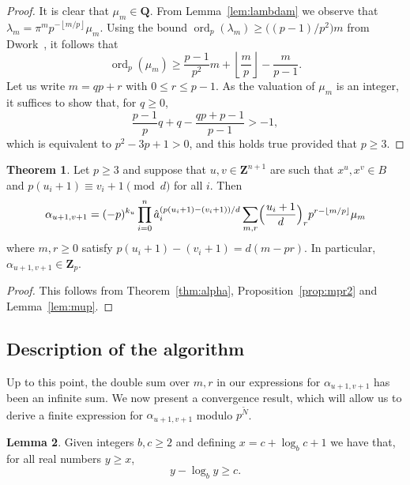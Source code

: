 \documentclass[a4paper,11pt]{article}
\numberwithin{equation}{section}
\providecommand{\floor}[1]{\left\lfloor#1\right\rfloor}   %
\newcommand{\ZZ}{\mathbf{Z}} %
\newcommand{\QQ}{\mathbf{Q}} %
\DeclareMathOperator{\ord}{ord}          %
\theoremstyle{definition}
\newtheorem{thm}{Theorem}[section]
\newtheorem{lem}[thm]{Lemma}
\begin{document}
\begin{proof}
It is clear that $\mu_m \in \QQ$.  From Lemma~\ref{lem:lambdam} 
we observe that $\lambda_m = \pi^m p^{- \floor{m/p}} \mu_m$.  Using the 
bound $\ord_p(\lambda_m) \geq \bigl((p-1)/p^2\bigr) m$ 
from Dwork~\citep[pp.~55--57]{Dwork1962}, it follows that 
\begin{equation}
\ord_p (\mu_m) \geq \frac{p-1}{p^2} m + \floor{\frac{m}{p}} - \frac{m}{p-1}.
\end{equation}
Let us write $m = q p + r$ with $0 \leq r \leq p-1$.  As the valuation 
of $\mu_m$ is an integer, it suffices to show that, for $q \geq 0$, 
\begin{equation}
\frac{p-1}{p} q + q - \frac{q p + p - 1}{p - 1} > -1,
\end{equation}
which is equivalent to $p^2 - 3p + 1 > 0$, and this holds true 
provided that $p \geq 3$.
\end{proof}

\begin{thm} \label{thm:alphap}
Let $p \geq 3$ and suppose that $u, v \in \ZZ^{n+1}$ are such 
that $x^u, x^v \in B$ and 
$p (u_i + 1) \equiv v_i + 1 \pmod{d}$ for all $i$. Then 
\begin{equation} \label{eq:alphap.0}
\alpha_{u+1,v+1} = (-p)^{k_u} \prod_{i=0}^n 
    \hat{a}_i^{(p (u_i + 1) - (v_i + 1))/d} \sum_{m,r} 
    \Bigl(\frac{u_i+1}{d}\Bigr)_r p^{r - \floor{m/p}} \mu_m
\end{equation}
where $m, r \geq 0$ satisfy $p (u_i + 1) - (v_i + 1) = d (m - pr)$. 
In particular, $\alpha_{u+1, v+1} \in \ZZ_p$. 
\end{thm}

\begin{proof}
This follows from Theorem~\ref{thm:alpha}, Proposition~\ref{prop:mpr2} 
and Lemma~\ref{lem:mup}.
\end{proof}

\subsection{Description of the algorithm}

Up to this point, the double sum over $m,r$ in our expressions 
for $\alpha_{u+1,v+1}$ has been an infinite sum.  We now present 
a convergence result, which will allow us to derive a finite 
expression for $\alpha_{u+1,v+1}$ modulo $p^{\tilde{N}}$.

\begin{lem} \label{lem:log}
Given integers $b,c \geq 2$ and defining $x = c + \log_b c + 1$ 
we have that, for all real numbers $y \geq x$, 
\begin{equation}
y - \log_b y \geq c.
\end{equation}
\end{lem}
\end{document}
